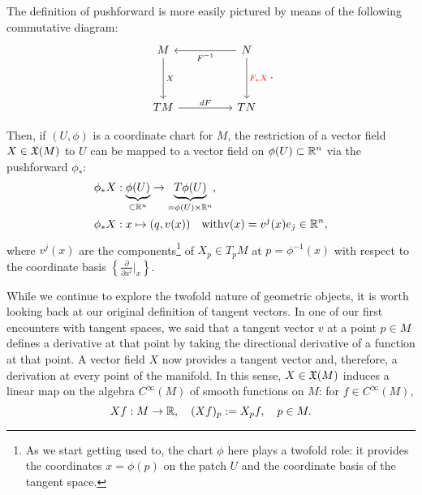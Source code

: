 The definition of pushforward is more easily pictured by means of the following commutative diagram:
\begin{equation}
    \begin{tikzcd}[row sep=huge, column sep=huge]
        M \arrow[d, "X"]
        & N \arrow[l, "F^{-1}"] \arrow[d, "F_*X" red]\\
        TM \arrow[r, "d F"]
        & TN
    \end{tikzcd}.
\end{equation}

Then, if $(U, \phi)$ is a coordinate chart for $M$, the restriction of a vector field $X\in\mathfrak{X}(M)$ to $U$ can be mapped to a vector field on $\phi(U)\subset\mathbb{R}^n$ via the pushforward $\phi_*$:
\begin{align}
    \phi_* X &: \LaTeXunderbrace{\phi(U)}_{\subset\R^n} \to \LaTeXunderbrace{T \phi(U)}_{=\phi(U)\times\R^n}, \\
    \phi_* X &: x\mapsto (q,v(x)) \quad\mbox{with}\mbox v(x) = v^j(x)e_j \in \R^n,
\end{align}
where $v^j(x)$ are the components\footnote{As we start getting used to, the chart $\phi$ here plays a twofold role: it provides the coordinates $x=\phi(p)$ on the patch $U$ and the coordinate basis of the tangent space.} of $X_p\in T_p M$ at $p=\phi^{-1}(x)$ with respect to the coordinate basis $\left\{\frac{\partial}{\partial x^i}\big|_x\right\}$.


While we continue to explore the twofold nature of geometric objects, it is worth looking back at our original definition of tangent vectors.
In one of our first encounters with tangent spaces, we said that a tangent vector $v$ at a point $p\in M$ defines a derivative at that point by taking the directional derivative of a function at that point.
A vector field $X$ now provides a tangent vector and, therefore, a derivation at every point of the manifold.
In this sense, $X\in\mathfrak{X}(M)$ induces a linear map on the algebra $C^\infty(M)$ of smooth functions on $M$: for $f\in C^\infty(M)$,
\begin{equation}
    Xf : M\to\mathbb{R}, \quad
    (Xf)_p := X_p f, \quad p\in M. 
\end{equation}

